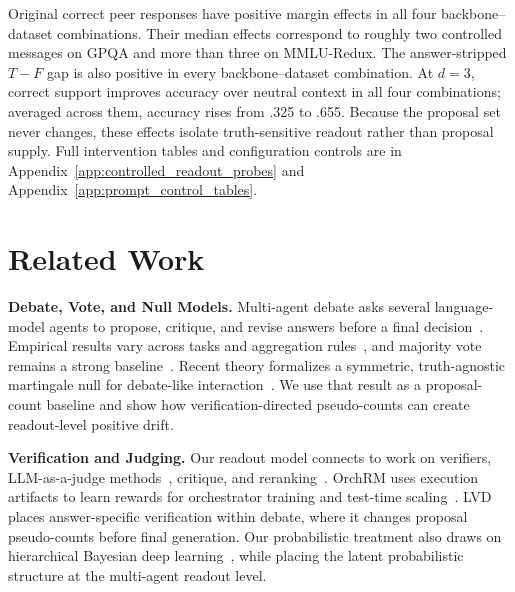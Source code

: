 \documentclass{article}
\newcommand{\appref}[1]{Appendix~\ref{#1}}
\begin{document}


Original correct peer responses have positive margin effects in all four
backbone--dataset combinations. Their median effects correspond to roughly two
controlled messages on GPQA and more than three on MMLU-Redux. The
answer-stripped $T-F$ gap is also positive in every backbone--dataset
combination. At $d=3$, correct support improves accuracy over neutral context
in all four combinations; averaged across them, accuracy rises from .325 to
.655. Because the proposal set never changes, these effects isolate
truth-sensitive readout rather than proposal supply. Full intervention tables
and configuration controls are in \appref{app:controlled_readout_probes} and
\appref{app:prompt_control_tables}.

\section{Related Work}
\label{sec:related_work}

\textbf{Debate, Vote, and Null Models.}
Multi-agent debate asks several language-model agents to propose, critique, and
revise answers before a final decision~\citep{du2024improving, chanchateval, xiong2023examining, chen2024reconcile}. Empirical
results vary across tasks and aggregation rules~\citep{smit2024should,wang2024rethinking,estornell2024multi,zhang2025if}, and majority vote remains a
strong baseline~\citep{wang2023selfconsistency,kaesberg-etal-2025-voting}. Recent theory
formalizes a symmetric, truth-agnostic martingale null for debate-like
interaction~\citep{choi2026debate}. We use that result as a proposal-count
baseline and show how verification-directed pseudo-counts can create
readout-level positive drift.

\textbf{Verification and Judging.}
Our readout model connects to work on verifiers, LLM-as-a-judge methods~\citep{tan2025judgebenchbenchmarkevaluatingllmbased, zhou2025evaluatingjudgesevaluatorsjetts},
critique, and reranking~\citep{cobbe2021trainingverifierssolvemath, lightman2023letsverifystepstep, li-etal-2023-making, zheng2023judgingllmasajudgemtbenchchatbot, NEURIPS2023_91edff07}.
OrchRM uses execution artifacts to learn rewards for orchestrator training and
test-time scaling~\citep{tsang2026rewardmodelingmultiagentorchestration}.
LVD places answer-specific verification within debate, where it changes
proposal pseudo-counts before final generation.
Our probabilistic treatment also draws on hierarchical Bayesian deep
learning~\citep{BDL,BDLSurvey}, while placing the latent probabilistic
structure at the multi-agent readout level.
\end{document}

